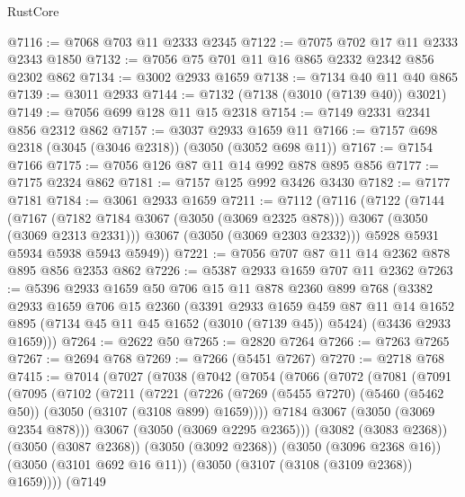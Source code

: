 \begin{lexlean}{RustCore}
\begin{coremodule}
@7116 := @7068 @703 @11 @2333 @2345
@7122 := @7075 @702 @17 @11 @2333 @2343 @1850
@7132 := @7056 @75 @701 @11 @16 @865 @2332 @2342 @856 @2302 @862
@7134 := @3002 @2933 @1659
@7138 := @7134 @40 @11 @40 @865
@7139 := @3011 @2933
@7144 := @7132 (@7138 (@3010 (@7139 @40)) @3021)
@7149 := @7056 @699 @128 @11 @15 @2318
@7154 := @7149 @2331 @2341 @856 @2312 @862
@7157 := @3037 @2933 @1659 @11
@7166 := @7157 @698 @2318 (@3045 (@3046 @2318)) (@3050 (@3052 @698 @11))
@7167 := @7154 @7166
@7175 := @7056 @126 @87 @11 @14 @992 @878 @895 @856
@7177 := @7175 @2324 @862
@7181 := @7157 @125 @992 @3426 @3430
@7182 := @7177 @7181
@7184 := @3061 @2933 @1659
@7211 := @7112
    (@7116
      (@7122
        (@7144
          (@7167 (@7182 @7184 @3067 (@3050 (@3069 @2325 @878))) @3067 (@3050 (@3069 @2313 @2331)))
          @3067
          (@3050 (@3069 @2303 @2332)))
        @5928
        @5931
        @5934
        @5938
        @5943
        @5949))
@7221 := @7056 @707 @87 @11 @14 @2362 @878 @895 @856 @2353 @862
@7226 := @5387 @2933 @1659 @707 @11 @2362
@7263 := @5396
    @2933
    @1659
    @50
    @706
    @15
    @11
    @878
    @2360
    @899
    @768
    (@3382
      @2933
      @1659
      @706
      @15
      @2360
      (@3391
        @2933
        @1659
        @459
        @87
        @11
        @14
        @1652
        @895
        (@7134 @45 @11 @45 @1652 (@3010 (@7139 @45)) @5424)
        (@3436 @2933 @1659)))
@7264 := @2622 @50
@7265 := @2820 @7264
@7266 := @7263 @7265
@7267 := @2694 @768
@7269 := @7266 (@5451 @7267)
@7270 := @2718 @768
@7415 := @7014
    (@7027
      (@7038
        (@7042
          (@7054
            (@7066
              (@7072
                (@7081
                  (@7091
                    (@7095
                      (@7102
                        (@7211
                          (@7221
                            (@7226
                              (@7269
                                (@5455 @7270)
                                (@5460 (@5462 @50))
                                (@3050 (@3107 (@3108 @899) @1659))))
                            @7184
                            @3067
                            (@3050 (@3069 @2354 @878)))
                          @3067
                          (@3050 (@3069 @2295 @2365)))
                        (@3082 (@3083 @2368))
                        (@3050 (@3087 @2368))
                        (@3050 (@3092 @2368))
                        (@3050 (@3096 @2368 @16))
                        (@3050 (@3101 @692 @16 @11))
                        (@3050 (@3107 (@3108 (@3109 @2368)) @1659))))
                    (@7149

\end{coremodule}
\end{lexlean}
